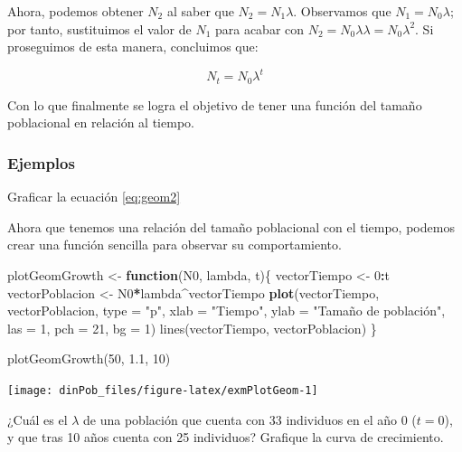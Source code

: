 \documentclass[12pt,letterpaper,]{book}
\newenvironment{Shaded}{\begin{snugshade}}{\end{snugshade}}
\newcommand{\KeywordTok}[1]{\textcolor[rgb]{0.13,0.29,0.53}{\textbf{#1}}}
\newcommand{\DataTypeTok}[1]{\textcolor[rgb]{0.13,0.29,0.53}{#1}}
\newcommand{\DecValTok}[1]{\textcolor[rgb]{0.00,0.00,0.81}{#1}}
\newcommand{\StringTok}[1]{\textcolor[rgb]{0.31,0.60,0.02}{#1}}
\newcommand{\ControlFlowTok}[1]{\textcolor[rgb]{0.13,0.29,0.53}{\textbf{#1}}}
\newcommand{\OperatorTok}[1]{\textcolor[rgb]{0.81,0.36,0.00}{\textbf{#1}}}
\newcommand{\NormalTok}[1]{#1}
\let\BeginKnitrBlock\begin \let\EndKnitrBlock\end
\begin{document}
Ahora, podemos obtener \(N_2\) al saber que \(N_2 = N_1 \lambda\).
Observamos que \(N_1 = N_0 \lambda\); por tanto, sustituimos el valor de
\(N_1\) para acabar con \(N_2 = N_0 \lambda \lambda = N_0 \lambda^2\).
Si proseguimos de esta manera, concluimos que:

\begin{equation}
N_t = N_0 \lambda^t
 \label{eq:geom2}
\end{equation}

Con lo que finalmente se logra el objetivo de tener una función del
tamaño poblacional en relación al tiempo.

\subsubsection{Ejemplos}\label{ejemplos}

\BeginKnitrBlock{example}
\protect\hypertarget{exm:plotGeom}{}{\label{exm:plotGeom} }Graficar la
ecuación \eqref{eq:geom2}
\EndKnitrBlock{example}

Ahora que tenemos una relación del tamaño poblacional con el tiempo,
podemos crear una función sencilla para observar su comportamiento.

\begin{Shaded}
\begin{Highlighting}[]
\NormalTok{plotGeomGrowth <-}\StringTok{ }\ControlFlowTok{function}\NormalTok{(N0, lambda, t)\{}
\NormalTok{    vectorTiempo <-}\StringTok{ }\DecValTok{0}\OperatorTok{:}\NormalTok{t}
\NormalTok{    vectorPoblacion <-}\StringTok{ }\NormalTok{N0}\OperatorTok{*}\NormalTok{lambda}\OperatorTok{^}\NormalTok{vectorTiempo}
    \KeywordTok{plot}\NormalTok{(vectorTiempo, vectorPoblacion,}
         \DataTypeTok{type =} \StringTok{"p"}\NormalTok{, }\DataTypeTok{xlab =} \StringTok{"Tiempo"}\NormalTok{, }\DataTypeTok{ylab =} \StringTok{"Tamaño de población",}
\StringTok{         las = 1, pch = 21, bg = 1)}
\StringTok{    lines(vectorTiempo, vectorPoblacion)}
\StringTok{\}}

\StringTok{plotGeomGrowth(50, 1.1, 10)}
\end{Highlighting}
\end{Shaded}

\begin{center}\texttt{[image: dinPob\_files/figure-latex/exmPlotGeom-1]} \end{center}

\BeginKnitrBlock{example}
\protect\hypertarget{exm:GeomExm2}{}{\label{exm:GeomExm2} } ¿Cuál es el
\(\lambda\) de una población que cuenta con 33 individuos en el año 0
(\(t=0\)), y que tras 10 años cuenta con 25 individuos? Grafique la
curva de crecimiento.
\EndKnitrBlock{example}
\end{document}
